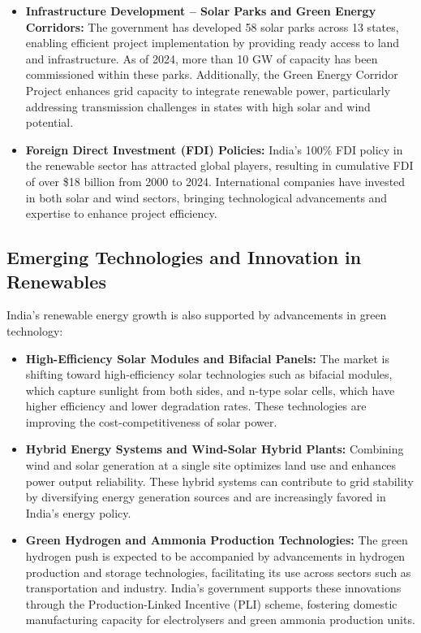 \documentclass[12pt]{article}
\begin{document}
\begin{spacing}{1.5}
\begin{itemize}
    \item \textbf{Infrastructure Development – Solar Parks and Green Energy Corridors:} The government has developed 58 solar parks across 13 states, enabling efficient project implementation by providing ready access to land and infrastructure. As of 2024, more than 10 GW of capacity has been commissioned within these parks. Additionally, the Green Energy Corridor Project enhances grid capacity to integrate renewable power, particularly addressing transmission challenges in states with high solar and wind potential.
    
    \item \textbf{Foreign Direct Investment (FDI) Policies:} India’s 100\% FDI policy in the renewable sector has attracted global players, resulting in cumulative FDI of over \$18 billion from 2000 to 2024. International companies have invested in both solar and wind sectors, bringing technological advancements and expertise to enhance project efficiency.
\end{itemize}

\subsection*{Emerging Technologies and Innovation in Renewables}
India’s renewable energy growth is also supported by advancements in green technology:
\begin{itemize}
    \item \textbf{High-Efficiency Solar Modules and Bifacial Panels:} The market is shifting toward high-efficiency solar technologies such as bifacial modules, which capture sunlight from both sides, and n-type solar cells, which have higher efficiency and lower degradation rates. These technologies are improving the cost-competitiveness of solar power.
    
    \item \textbf{Hybrid Energy Systems and Wind-Solar Hybrid Plants:} Combining wind and solar generation at a single site optimizes land use and enhances power output reliability. These hybrid systems can contribute to grid stability by diversifying energy generation sources and are increasingly favored in India’s energy policy.
    
    \item \textbf{Green Hydrogen and Ammonia Production Technologies:} The green hydrogen push is expected to be accompanied by advancements in hydrogen production and storage technologies, facilitating its use across sectors such as transportation and industry. India’s government supports these innovations through the Production-Linked Incentive (PLI) scheme, fostering domestic manufacturing capacity for electrolysers and green ammonia production units.
\end{itemize}


\end{spacing}
\end{document}
